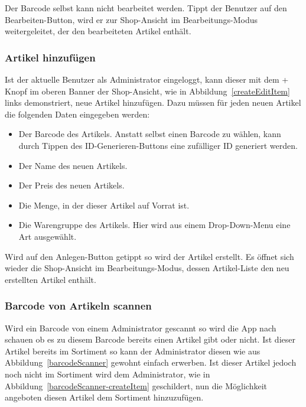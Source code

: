 Der Barcode selbst kann nicht bearbeitet werden.
Tippt der Benutzer auf den Bearbeiten-Button, wird er zur Shop-Ansicht im Bearbeitungs-Modus weitergeleitet, der den bearbeiteten Artikel enthält.


\subsubsection{Artikel hinzufügen} \label{subsubsec:shop-add-items}

Ist der aktuelle Benutzer als Administrator eingeloggt, kann dieser mit dem + Knopf im oberen Banner der Shop-Ansicht, wie in Abbildung~\ref{createEditItem} links demonstriert, neue Artikel hinzufügen.
Dazu müssen für jeden neuen Artikel die folgenden Daten eingegeben werden:

\begin{itemize}
	\item Der Barcode des Artikels.
	Anstatt selbst einen Barcode zu wählen, kann durch Tippen des ID-Generieren-Buttons eine zufälliger ID generiert werden.

	\item Der Name des neuen Artikels.

	\item Der Preis des neuen Artikels.

	\item Die Menge, in der dieser Artikel auf Vorrat ist.

	\item Die Warengruppe des Artikels.
	Hier wird aus einem Drop-Down-Menu eine Art ausgewählt.
\end{itemize}

Wird auf den Anlegen-Button getippt so wird der Artikel erstellt.
Es öffnet sich wieder die Shop-Ansicht im Bearbeitungs-Modus, dessen Artikel-Liste den neu erstellten Artikel enthält.

\subsubsection{Barcode von Artikeln scannen} \label{subsubsec:shop-admin-scan-item}

Wird ein Barcode von einem Administrator gescannt so wird die App nach schauen ob es zu diesem Barcode bereits einen Artikel gibt oder nicht.
Ist dieser Artikel bereits im Sortiment so kann der Administrator diesen wie aus Abbildung~\ref{barcodeScanner} gewohnt einfach erwerben.
Ist dieser Artikel jedoch noch nicht im Sortiment wird dem Administrator, wie in Abbildung~\ref{barcodeScanner-createItem} geschildert, nun die Möglichkeit angeboten diesen Artikel dem Sortiment hinzuzufügen.

